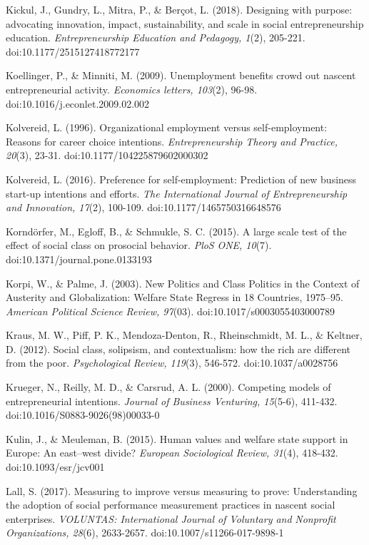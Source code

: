 \documentclass{article}
\begin{document}
Kickul, J., Gundry, L., Mitra, P., \& Berçot, L. (2018). Designing with purpose: advocating innovation, impact, sustainability, and scale in social entrepreneurship education. \emph{Entrepreneurship Education and Pedagogy, 1}(2), 205-221. doi:10.1177/2515127418772177

Koellinger, P., \& Minniti, M. (2009). Unemployment benefits crowd out nascent entrepreneurial activity. \emph{Economics letters, 103}(2), 96-98. doi:10.1016/j.econlet.2009.02.002

Kolvereid, L. (1996). Organizational employment versus self-employment: Reasons for career choice intentions. \emph{Entrepreneurship Theory and Practice, 20}(3), 23-31. doi:10.1177/104225879602000302

Kolvereid, L. (2016). Preference for self-employment: Prediction of new business start-up intentions and efforts. \emph{The International Journal of Entrepreneurship and Innovation, 17}(2), 100-109. doi:10.1177/1465750316648576

Korndörfer, M., Egloff, B., \& Schmukle, S. C. (2015). A large scale test of the effect of social class on prosocial behavior. \emph{PloS}\emph{ ONE, 10}(7). doi:10.1371/journal.pone.0133193

Korpi, W., \& Palme, J. (2003). New Politics and Class Politics in the Context of Austerity and Globalization: Welfare State Regress in 18 Countries, 1975--95. \emph{American Political Science Review, 97}(03). doi:10.1017/s0003055403000789

Kraus, M. W., Piff, P. K., Mendoza-Denton, R., Rheinschmidt, M. L., \& Keltner, D. (2012). Social class, solipsism, and contextualism: how the rich are different from the poor. \emph{Psychological Review, 119}(3), 546-572. doi:10.1037/a0028756

Krueger, N., Reilly, M. D., \& Carsrud, A. L. (2000). Competing models of entrepreneurial intentions. \emph{Journal of Business Venturing, 15}(5-6), 411-432. doi:10.1016/S0883-9026(98)00033-0

Kulin, J., \& Meuleman, B. (2015). Human values and welfare state support in Europe: An east--west divide? \emph{European Sociological Review, 31}(4), 418-432. doi:10.1093/esr/jcv001

Lall, S. (2017). Measuring to improve versus measuring to prove: Understanding the adoption of social performance measurement practices in nascent social enterprises. \emph{VOLUNTAS: International Journal of Voluntary and }\emph{Nonprofit}\emph{ Organizations, 28}(6), 2633-2657. doi:10.1007/s11266-017-9898-1
\end{document}

